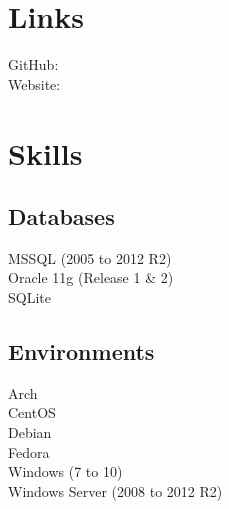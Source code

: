 \documentclass[]{deedy-resume-openfont}
\begin{document}
%
%



%
%

\begin{minipage}[t]{0.33\textwidth}


\section{Links}
GitHub: \href{https://github.com/enckse}{} \\
Website:  \href{https://seanenck.network}{} \\
\sectionsep



\section{Skills}

\subsection{Databases}
\textbullet{} MSSQL (2005 to 2012 R2) \\
\textbullet{} Oracle 11g (Release 1 \& 2) \\
\textbullet{} SQLite
\sectionsep

\subsection{Environments}
\textbullet{} Arch \\ 
\textbullet{} CentOS \\
\textbullet{} Debian \\
\textbullet{} Fedora \\
\textbullet{} Windows (7 to 10) \\
\textbullet{} Windows Server (2008 to 2012 R2)
\sectionsep


\end{minipage}
\end{document}
